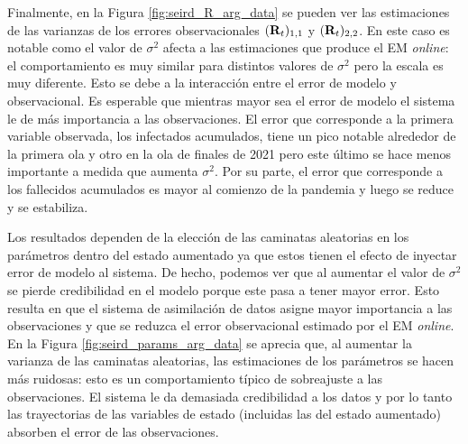 Finalmente, en la Figura \ref{fig:seird_R_arg_data} se pueden ver las estimaciones de las varianzas de los errores observacionales $(\mathbf{R}_t)_{1,1}$ y $(\mathbf{R}_t)_{2, 2}$. En este caso es notable como el valor de $\sigma^2$ afecta a las estimaciones que produce el EM \textit{online}: el comportamiento es muy similar para distintos valores de $\sigma^2$ pero la escala es muy diferente. Esto se debe a la interacción entre el error de modelo y observacional. Es esperable que mientras mayor sea el error de modelo el sistema le de más importancia a las observaciones. El error que corresponde a la primera variable observada, los infectados acumulados, tiene un pico notable alrededor de la primera ola y otro en la ola de finales de 2021 pero este último se hace menos importante a medida que aumenta $\sigma^2$. Por su parte, el error que corresponde a los fallecidos acumulados es mayor al comienzo de la pandemia y luego se reduce y se estabiliza.

Los resultados dependen de la elección de las caminatas aleatorias en los parámetros dentro del estado aumentado ya que estos tienen el efecto de inyectar error de modelo al sistema. De hecho, podemos ver que al aumentar el valor de $\sigma^2$ se pierde credibilidad en el modelo porque este pasa a tener mayor error. Esto resulta en que el sistema de asimilación de datos asigne mayor importancia a las observaciones y que se reduzca el error observacional estimado por el EM \textit{online}. En la Figura \ref{fig:seird_params_arg_data} se aprecia que, al aumentar la varianza de las caminatas aleatorias, las estimaciones de los parámetros se hacen más ruidosas: esto es un comportamiento típico de sobreajuste a las observaciones. El sistema le da demasiada credibilidad a los datos y por lo tanto las trayectorias de las variables de estado (incluidas las del estado aumentado) absorben el error de las observaciones.

